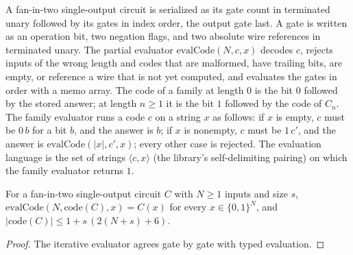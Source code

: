 \begin{definition}
  \label{def:circuits-code}
  \leanok
  A fan-in-two single-output circuit is serialized as its gate count in
  terminated unary followed by its gates in index order, the output gate last.
  A gate is written as an operation bit, two negation flags, and two absolute
  wire references in terminated unary. The partial evaluator
  $\mathrm{evalCode}(N, c, x)$ decodes $c$, rejects inputs of the wrong length
  and codes that are malformed, have trailing bits, are empty, or reference a
  wire that is not yet computed, and evaluates the gates in order with a memo
  array. The code of a family at length $0$ is the bit
  $0$ followed by the stored answer; at length $n \ge 1$ it is the bit $1$
  followed by the code of $C_n$. The family evaluator runs a code $c$ on a
  string $x$ as follows: if $x$ is empty, $c$ must be $0\,b$ for a bit $b$,
  and the answer is $b$; if $x$ is nonempty, $c$ must be $1\,c'$, and the
  answer is $\mathrm{evalCode}(|x|, c', x)$; every other case is rejected. The
  evaluation language is the set of strings $\langle c, x \rangle$ (the
  library's self-delimiting pairing) on which the family evaluator returns
  $1$.
\end{definition}

\begin{lemma}
  \label{lem:circuits-codec}
  \leanok
  For a fan-in-two single-output circuit $C$ with $N \ge 1$ inputs and size $s$,
  $\mathrm{evalCode}(N, \mathrm{code}(C), x) = C(x)$ for every
  $x \in \{0,1\}^N$, and $|\mathrm{code}(C)| \le 1 + s\,(2(N + s) + 6)$.
\end{lemma}
\begin{proof}
  \leanok
  The iterative evaluator agrees gate by gate with typed evaluation.
\end{proof}

